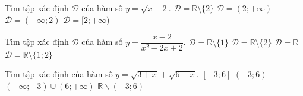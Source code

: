 	\begin{ex}%
		Tìm tập xác định $\mathcal{D}$ của hàm số $y=\sqrt{x-2}$.
		\choice
		{$\mathcal{D}=\mathbb{R}\setminus\{2\}$}
		{$\mathcal{D}=(2;+\infty)$}
		{$\mathcal{D}=(-\infty;2)$}
		{\True $\mathcal{D}=[2;+\infty)$}
		\loigiai{
				\begin{itemize}
				\item [$\bullet$] Điều kiện xác định $x-2 \ge 0 \Leftrightarrow x \ge 2$.
				\item [$\bullet$] Tập xác định là $\mathcal{D}=[2;+\infty)$.
			\end{itemize}
		}
	\end{ex}
	
	\begin{ex}%
		Tìm tập xác định $\mathcal{D}$ của hàm số $y=\dfrac{x-2}{x^2-2x+2}$.
		\choice
		{$\mathcal{D}=\mathbb{R}\setminus\{1\}$}
		{$\mathcal{D}=\mathbb{R}\setminus\{2\}$}
		{\True $\mathcal{D}=\mathbb{R}$}
		{$\mathcal{D}=\mathbb{R}\setminus\{1;2\}$}
	\end{ex}
	
	

	\begin{ex}%
		Tìm tập xác định của hàm số $y=\sqrt{3+x}+\sqrt{6-x}$.
		\choice
		{\True $[-3;6]$}
		{$(-3;6)$}
		{$(-\infty;-3)\cup (6;+\infty)$}
		{$\mathbb{R}\backslash(-3;6)$}
	\end{ex}
	
